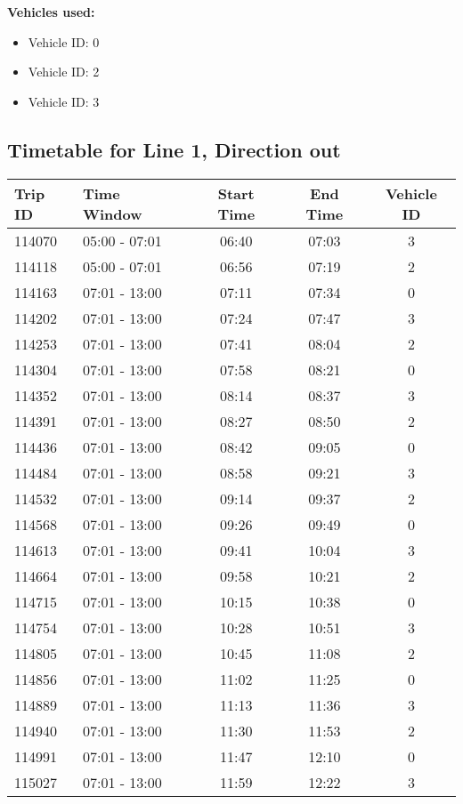 \documentclass{article}
\begin{document}
\textbf{Vehicles used:}
\begin{itemize}
  \item Vehicle ID: 0
  \item Vehicle ID: 2
  \item Vehicle ID: 3
\end{itemize}

\subsection*{Timetable for Line 1, Direction out}
\begin{tabular}{llccc}
\toprule
Trip ID & Time Window & Start Time & End Time & Vehicle ID \\
\midrule
114070 & 05:00 - 07:01 & 06:40 & 07:03 & 3 \\
114118 & 05:00 - 07:01 & 06:56 & 07:19 & 2 \\
114163 & 07:01 - 13:00 & 07:11 & 07:34 & 0 \\
114202 & 07:01 - 13:00 & 07:24 & 07:47 & 3 \\
114253 & 07:01 - 13:00 & 07:41 & 08:04 & 2 \\
114304 & 07:01 - 13:00 & 07:58 & 08:21 & 0 \\
114352 & 07:01 - 13:00 & 08:14 & 08:37 & 3 \\
114391 & 07:01 - 13:00 & 08:27 & 08:50 & 2 \\
114436 & 07:01 - 13:00 & 08:42 & 09:05 & 0 \\
114484 & 07:01 - 13:00 & 08:58 & 09:21 & 3 \\
114532 & 07:01 - 13:00 & 09:14 & 09:37 & 2 \\
114568 & 07:01 - 13:00 & 09:26 & 09:49 & 0 \\
114613 & 07:01 - 13:00 & 09:41 & 10:04 & 3 \\
114664 & 07:01 - 13:00 & 09:58 & 10:21 & 2 \\
114715 & 07:01 - 13:00 & 10:15 & 10:38 & 0 \\
114754 & 07:01 - 13:00 & 10:28 & 10:51 & 3 \\
114805 & 07:01 - 13:00 & 10:45 & 11:08 & 2 \\
114856 & 07:01 - 13:00 & 11:02 & 11:25 & 0 \\
114889 & 07:01 - 13:00 & 11:13 & 11:36 & 3 \\
114940 & 07:01 - 13:00 & 11:30 & 11:53 & 2 \\
114991 & 07:01 - 13:00 & 11:47 & 12:10 & 0 \\
115027 & 07:01 - 13:00 & 11:59 & 12:22 & 3 \\

\end{tabular}
\end{document}

